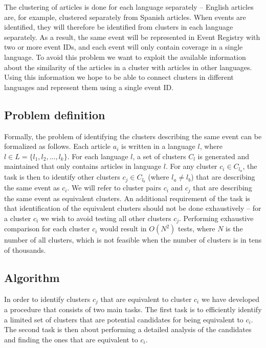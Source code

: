 \documentclass[twoside,11pt]{article}
\begin{document}
The clustering of articles is done for each language separately -- English articles are, for example, clustered separately from Spanish articles. When events are identified, they will therefore be identified from clusters in each language separately. As a result, the same event will be represented in Event Registry with two or more event IDs, and each event will only contain coverage in a single language. To avoid this problem we want to exploit the available information about the similarity of the articles in a cluster with articles in other languages. Using this information we hope to be able to connect clusters in different languages and represent them using a single event ID.

\subsection{Problem definition}

Formally, the problem of identifying the clusters describing the same event can be formalized as follows. Each article $a_i$ is written in a language $l$, where $l \in L = \{l_1,l_2,...,l_k\}$. For each language $l$, a set of clusters $C_l$ is generated and maintained that only contains articles in language $l$. For any cluster $c_i \in C_{l_a}$, the task is then to identify other clusters $c_j \in C_{l_b}$ (where $l_a \neq l_b$) that are describing the same event as $c_i$. We will refer to cluster pairs $c_i$ and $c_j$ that are describing the same event as equivalent clusters. An additional requirement of the task is that identification of the equivalent clusters should not be done exhaustively -- for a cluster $c_i$ we wish to avoid testing all other clusters $c_j$. Performing exhaustive comparison for each cluster $c_i$ would result in $O(N^2)$ tests, where $N$ is the number of all clusters, which is not feasible when the number of clusters is in tens of thousands.

\subsection{Algorithm}

In order to identify clusters $c_j$ that are equivalent to cluster $c_i$ we have developed a procedure that consists of two main tasks. The first task is to efficiently identify a limited set of clusters that are potential candidates for being equivalent to $c_i$. The second task is then about performing a detailed analysis of the candidates and finding the ones that are equivalent to $c_i$.
\end{document}
